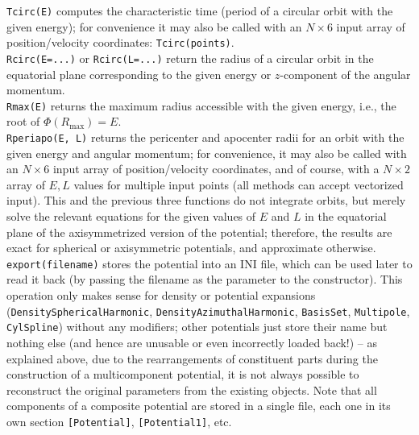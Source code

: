 \documentclass[12pt]{article}
\newcommand{\ppp}[1]{\textcolor{darkolive} {\texttt{#1}}}
\begin{document}
\texttt{Tcirc(E)} computes the characteristic time (period of a circular orbit with the given energy); for convenience it may also be called with an $N\times6$ input array of position/velocity coordinates: \texttt{Tcirc(points)}.\\[2mm]
\texttt{Rcirc(E=...)} or \texttt{Rcirc(L=...)} return the radius of a circular orbit in the equatorial plane corresponding to the given energy or $z$-component of the angular momentum.\\[2mm]
\texttt{Rmax(E)} returns the maximum radius accessible with the given energy, i.e., the root of $\Phi(R_\mathrm{max})=E$.\\[2mm]
\texttt{Rperiapo(E, L)} returns the pericenter and apocenter radii for an orbit with the given energy and angular momentum; for convenience, it may also be called with an $N\times6$ input array of position/velocity coordinates, and of course, with a $N\times2$ array of $E,L$ values for multiple input points (all methods can accept vectorized input). This and the previous three functions do not integrate orbits, but merely solve the relevant equations for the given values of $E$ and $L$ in the equatorial plane of the axisymmetrized version of the potential; therefore, the results are exact for spherical or axisymmetric potentials, and approximate otherwise. \\[2mm]
\texttt{export(filename)} stores the potential into an INI file, which can be used later to read it back (by passing the filename as the parameter to the constructor). This operation only makes sense for density or potential expansions (\ppp{DensitySphericalHarmonic}, \ppp{Density\-AzimuthalHarmonic}, \ppp{BasisSet}, \ppp{Multipole}, \ppp{CylSpline}) without any modifiers; other potentials just store their name but nothing else (and hence are unusable or even incorrectly loaded back!) -- as explained above, due to the rearrangements of constituent parts during the construction of a multicomponent potential, it is not always possible to reconstruct the original parameters from the existing objects. Note that all components of a composite potential are stored in a single file, each one in its own section \texttt{[Potential]}, \texttt{[Potential1]}, etc.
\end{document}
